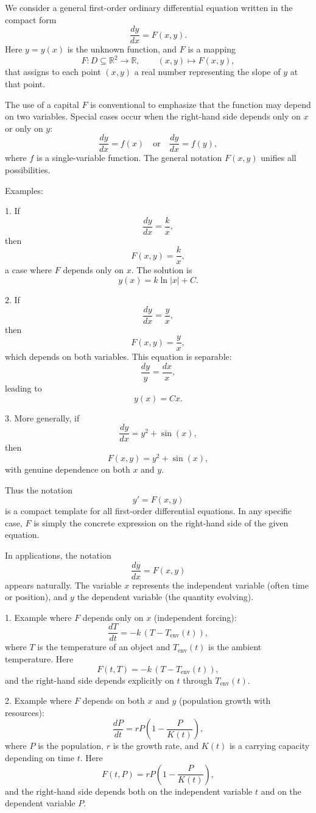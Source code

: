 \documentclass[11pt,a4paper]{article}
\begin{document}
	
	
	We consider a general first-order ordinary differential equation written in the compact form
	$$
	\frac{dy}{dx} = F(x,y).
	$$
	Here $y=y(x)$ is the unknown function, and $F$ is a mapping
	$$
	F : D \subseteq \mathbb{R}^2 \to \mathbb{R}, \qquad (x,y) \mapsto F(x,y),
	$$
	that assigns to each point $(x,y)$ a real number representing the slope of $y$ at that point.
	
	The use of a capital $F$ is conventional to emphasize that the function may depend on two variables.  
	Special cases occur when the right-hand side depends only on $x$ or only on $y$:
	$$
	\frac{dy}{dx} = f(x) \quad \text{or} \quad \frac{dy}{dx} = f(y),
	$$
	where $f$ is a single-variable function. The general notation $F(x,y)$ unifies all possibilities.
	
	Examples:
	
	1. If
	$$
	\frac{dy}{dx} = \frac{k}{x},
	$$
	then
	$$
	F(x,y) = \frac{k}{x},
	$$
	a case where $F$ depends only on $x$. The solution is
	$$
	y(x) = k \ln |x| + C.
	$$
	
	2. If
	$$
	\frac{dy}{dx} = \frac{y}{x},
	$$
	then
	$$
	F(x,y) = \frac{y}{x},
	$$
	which depends on both variables. This equation is separable:
	$$
	\frac{dy}{y} = \frac{dx}{x},
	$$
	leading to
	$$
	y(x) = Cx.
	$$
	
	3. More generally, if
	$$
	\frac{dy}{dx} = y^2 + \sin(x),
	$$
	then
	$$
	F(x,y) = y^2 + \sin(x),
	$$
	with genuine dependence on both $x$ and $y$.
	
	Thus the notation
	$$
	y' = F(x,y)
	$$
	is a compact template for all first-order differential equations. In any specific case, $F$ is simply the concrete expression on the right-hand side of the given equation.
	
	In applications, the notation
	$$
	\frac{dy}{dx} = F(x,y)
	$$
	appears naturally. The variable $x$ represents the independent variable (often time or position), and $y$ the dependent variable (the quantity evolving).
	
	1. Example where $F$ depends only on $x$ (independent forcing):
	$$
	\frac{dT}{dt} = -k\,(T - T_{\text{env}}(t)),
	$$
	where $T$ is the temperature of an object and $T_{\text{env}}(t)$ is the ambient temperature.  
	Here
	$$
	F(t,T) = -k\,(T - T_{\text{env}}(t)),
	$$
	and the right-hand side depends explicitly on $t$ through $T_{\text{env}}(t)$.
	
	2. Example where $F$ depends on both $x$ and $y$ (population growth with resources):
	$$
	\frac{dP}{dt} = r P\left(1 - \frac{P}{K(t)}\right),
	$$
	where $P$ is the population, $r$ is the growth rate, and $K(t)$ is a carrying capacity depending on time $t$.  
	Here
	$$
	F(t,P) = r P\left(1 - \frac{P}{K(t)}\right),
	$$
	and the right-hand side depends both on the independent variable $t$ and on the dependent variable $P$.
	
\end{document}
